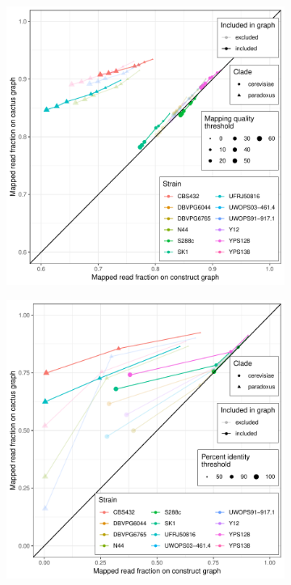 \documentclass{article}
\begin{document}
\clearpage
\begin{figure}
  \begin{subfigure}[b]{.5\textwidth}
    \caption{}
    \includegraphics[width=\textwidth]{pdf/yeast-mapping-quality-four.pdf}
  \end{subfigure}
  \begin{subfigure}[b]{.5\textwidth}
    \caption{}
    \includegraphics[width=\textwidth]{pdf/yeast-mapping-identity-four.pdf}
  \end{subfigure}
\end{figure}
\end{document}
